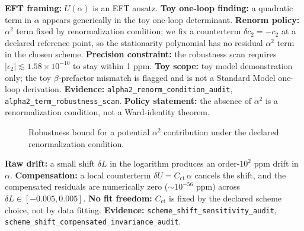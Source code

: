 \begin{tcolorbox}[colback=yellow!5, colframe=yellow!60!black,
    title={\textbf{Status of the $\alpha^2$ term and renorm condition}}, fonttitle=\bfseries\small]
\textbf{EFT framing:} $U(\alpha)$ is an EFT ansatz.
\textbf{Toy one-loop finding:} a quadratic term in $\alpha$ appears generically in the toy one-loop determinant.
\textbf{Renorm policy:} $\alpha^2$ term fixed by renormalization condition; we fix a counterterm $\delta c_2=-c_2$ at a declared reference point,
so the stationarity polynomial has no residual $\alpha^2$ term in the chosen scheme.
\textbf{Precision constraint:} the robustness scan requires $|\epsilon_2|\lesssim 1.58\times 10^{-10}$ to stay within 1 ppm.
\textbf{Toy scope:} toy model demonstration only; the toy $\beta$-prefactor mismatch is flagged and is not a Standard Model one-loop derivation.
\textbf{Evidence:} \texttt{alpha2\_renorm\_condition\_audit}, \texttt{alpha2\_term\_robustness\_scan}.
\textbf{Policy statement:} the absence of $\alpha^2$ is a renormalization condition, not a Ward-identity theorem.
\end{tcolorbox}

\begin{figure}[H]
\centering
{}
\caption{Robustness bound for a potential $\alpha^2$ contribution under the declared renormalization condition.}
\label{fig:alpha2-sensitivity}
\end{figure}

\begin{tcolorbox}[colback=yellow!5, colframe=yellow!60!black,
    title={\textbf{Scheme shifts and counterterm compensation}}, fonttitle=\bfseries\small]
\textbf{Raw drift:} a small shift $\delta L$ in the logarithm produces an order-$10^2$ ppm drift in $\alpha$.
\textbf{Compensation:} a local counterterm $\delta U = C_{\mathrm{ct}}\,\alpha$ cancels the shift,
and the compensated residuals are numerically zero ($\sim 10^{-56}$ ppm) across $\delta L\in[-0.005,0.005]$.
\textbf{No fit freedom:} $C_{\mathrm{ct}}$ is fixed by the declared scheme choice, not by data fitting.
\textbf{Evidence:} \texttt{scheme\_shift\_sensitivity\_audit}, \texttt{scheme\_shift\_compensated\_invariance\_audit}.
\end{tcolorbox}

